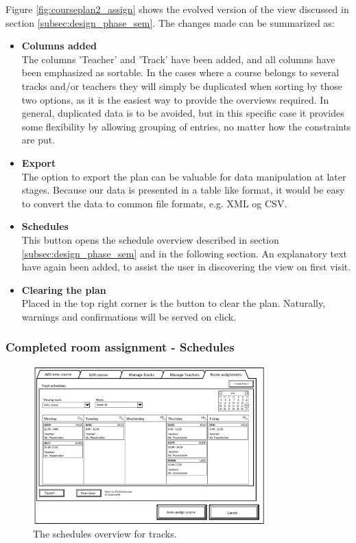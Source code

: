 Figure \ref{fig:courseplan2_assign} shows the evolved version of the view discussed in section \ref{subsec:design_phase_sem}. The changes made can be summarized as:
\begin{itemize}
\item \textbf{Columns added} \\
The columns 'Teacher' and 'Track' have been added, and all columns have been emphasized as sortable. In the cases where a course belongs to several tracks and/or teachers they will simply be duplicated when sorting by those two options, as it is the easiest way to provide the overviews required. In general, duplicated data is to be avoided, but in this specific case it provides some flexibility by allowing grouping of entries, no matter how the constraints are put.
\item \textbf{Export} \\
The option to export the plan can be valuable for data manipulation at later stages. Because our data is presented in a table like format, it would be easy to convert the data to common file formats, e.g. XML og CSV.
\item \textbf{Schedules} \\
This button opens the schedule overview described in section \ref{subsec:design_phase_sem} and in the following section. An explanatory text have again been added, to assist the user in discovering the view on first visit. 
\item \textbf{Clearing the plan} \\
Placed in the top right corner is the button to clear the plan. Naturally, warnings and confirmations will be served on click.
\end{itemize}

\subsubsection{Completed room assignment - Schedules}
\label{subsub:schedules}
\begin{figure}[htb]
\begin{center}
\leavevmode
\includegraphics[width=0.8\textwidth]{images/courseplan2_Room_Assignments_schedules}
\end{center}
\caption{The schedules overview for tracks.}
\label{fig:courseplan2_assign_sche}
\end{figure}

